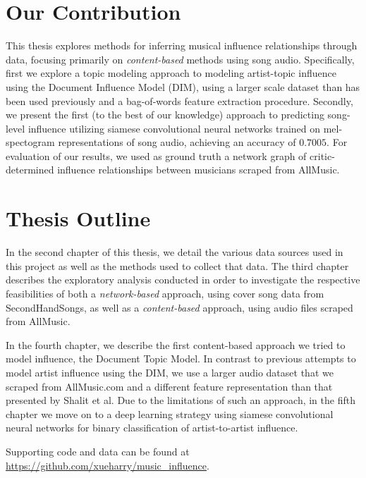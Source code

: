\section{Our Contribution}
This thesis explores methods for inferring musical influence relationships through data, focusing primarily on \textit{content-based} methods using song audio. Specifically, first we explore a topic modeling approach to modeling artist-topic influence using the Document Influence Model (DIM), using a larger scale dataset than has been used previously and a bag-of-words feature extraction procedure. Secondly, we present the first (to the best of our knowledge) approach to predicting song-level influence utilizing siamese convolutional neural networks trained on mel-spectogram representations of song audio, achieving an accuracy of $0.7005$. For evaluation of our results, we used as ground truth a network graph of critic-determined influence relationships between musicians scraped from AllMusic.

\section{Thesis Outline}
In the second chapter of this thesis, we detail the various data sources used in this project as well as the methods used to collect that data. The third chapter describes the exploratory analysis conducted in order to investigate the respective feasibilities of both a \textit{network-based} approach, using cover song data from SecondHandSongs, as well as a \textit{content-based} approach, using audio files scraped from AllMusic.

In the fourth chapter, we describe the first content-based approach we tried to model influence, the Document Topic Model. In contrast to previous attempts \cite{shalit2013modeling} to model artist influence using the DIM, we use a larger audio dataset that we scraped from AllMusic.com and a different feature representation than that presented by Shalit et al. Due to the limitations of such an approach, in the fifth chapter we move on to a deep learning strategy using siamese convolutional neural networks for binary classification of artist-to-artist influence. 

Supporting code and data can be found at \url{https://github.com/xueharry/music_influence}.